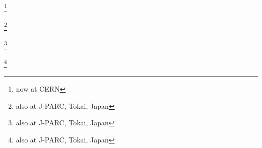 \author{K.\,Abe}\INSTBJ
\author{J.\,Amey}\INSTEI
\author{C.\,Andreopoulos}\INSTEH\INSTFC
\author{M.\,Antonova}\INSTEB
\author{S.\,Aoki}\INSTCC
\author{A.\,Ariga}\INSTEE
\author{Y.\,Ashida}\INSTCD
\author{S.\,Ban}\INSTCD
\author{M.\,Barbi}\INSTE
\author{G.J.\,Barker}\INSTFD
\author{G.\,Barr}\INSTGG
\author{C.\,Barry}\INSTFC
\author{M.\,Batkiewicz}\INSTDG
\author{V.\,Berardi}\INSTGF
\author{S.\,Berkman}\INSTD\INSTB
\author{S.\,Bhadra}\INSTH
\author{S.\,Bienstock}\INSTBB
\author{A.\,Blondel}\INSTEG
\author{S.\,Bolognesi}\INSTI
\author{S.\,Bordoni }\thanks{now at CERN}\INSTED
\author{S.B.\,Boyd}\INSTFD
\author{D.\,Brailsford}\INSTEJ
\author{A.\,Bravar}\INSTEG
\author{C.\,Bronner}\INSTBJ
\author{M.\,Buizza Avanzini}\INSTBA
\author{R.G.\,Calland}\INSTHA
\author{T.\,Campbell}\INSTFG
\author{S.\,Cao}\INSTCB
\author{S.L.\,Cartwright}\INSTFB
\author{M.G.\,Catanesi}\INSTGF
\author{A.\,Cervera}\INSTEC
\author{A.\,Chappell}\INSTFD
\author{C.\,Checchia}\INSTBF
\author{D.\,Cherdack}\INSTFG
\author{N.\,Chikuma}\INSTCH
\author{G.\,Christodoulou}\INSTFC
\author{J.\,Coleman}\INSTFC
\author{G.\,Collazuol}\INSTBF
\author{D.\,Coplowe}\INSTGG
\author{A.\,Cudd}\INSTHB
\author{A.\,Dabrowska}\INSTDG
\author{G.\,De Rosa}\INSTBE
\author{T.\,Dealtry}\INSTEJ
\author{P.F.\,Denner}\INSTFD
\author{S.R.\,Dennis}\INSTFC
\author{C.\,Densham}\INSTEH
\author{F.\,Di Lodovico}\INSTFA
\author{S.\,Dolan}\INSTGG
\author{O.\,Drapier}\INSTBA
\author{K.E.\,Duffy}\INSTGG
\author{J.\,Dumarchez}\INSTBB
\author{P.\,Dunne}\INSTEI
\author{S.\,Emery-Schrenk}\INSTI
\author{A.\,Ereditato}\INSTEE
\author{T.\,Feusels}\INSTD\INSTB
\author{A.J.\,Finch}\INSTEJ
\author{G.A.\,Fiorentini}\INSTH
\author{M.\,Friend}\thanks{also at J-PARC, Tokai, Japan}\INSTCB
\author{Y.\,Fujii}\thanks{also at J-PARC, Tokai, Japan}\INSTCB
\author{D.\,Fukuda}\INSTGJ
\author{Y.\,Fukuda}\INSTCE
\author{A.\,Garcia}\INSTED
\author{C.\,Giganti}\INSTBB
\author{F.\,Gizzarelli}\INSTI
\author{T.\,Golan}\INSTEA
\author{M.\,Gonin}\INSTBA
\author{D.R.\,Hadley}\INSTFD
\author{L.\,Haegel}\INSTEG
\author{J.T.\,Haigh}\INSTFD
\author{D.\,Hansen}\INSTGC
\author{J.\,Harada}\INSTCF
\author{M.\,Hartz}\INSTHA\INSTB
\author{T.\,Hasegawa}\thanks{also at J-PARC, Tokai, Japan}\INSTCB
\author{N.C.\,Hastings}\INSTE
\author{T.\,Hayashino}\INSTCD
\author{Y.\,Hayato}\INSTBJ\INSTHA
\author{A.\,Hillairet}\INSTG
\author{T.\,Hiraki}\INSTCD
\author{A.\,Hiramoto}\INSTCD
\author{S.\,Hirota}\INSTCD
\author{M.\,Hogan}\INSTFG
\author{J.\,Holeczek}\INSTDI
\author{F.\,Hosomi}\INSTCH
\author{K.\,Huang}\INSTCD
\author{A.K.\,Ichikawa}\INSTCD
\author{M.\,Ikeda}\INSTBJ
\author{J.\,Imber}\INSTBA
